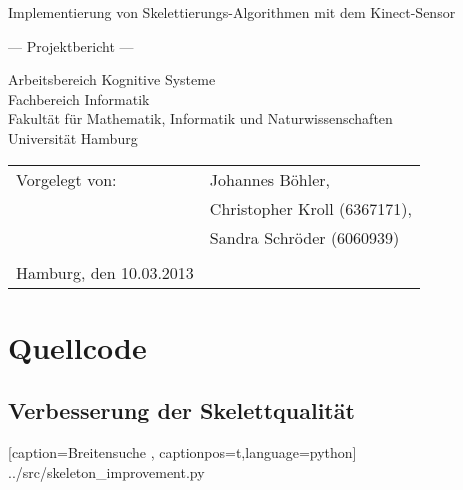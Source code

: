 \documentclass[
	12pt,
	a4paper,
	BCOR10mm,
	DIV14,
	listof=totoc,
	bibliography=totoc,
	headsepline
]{scrreprt}
\begin{document}
\begin{titlepage}
	\begin{center}
		{\titlefont\huge Implementierung von Skelettierungs-Algorithmen mit dem Kinect-Sensor\par}

		\bigskip
		\bigskip

		{\titlefont\Large --- Projektbericht ---\par}

		\bigskip
		\bigskip

		{\large Arbeitsbereich Kognitive Systeme\\
		Fachbereich Informatik\\
		Fakultät für Mathematik, Informatik und Naturwissenschaften\\
		Universität Hamburg\par}
	\end{center}
	
	\vfill
	
	{\large \begin{tabular}{ll}
		Vorgelegt von: & Johannes Böhler, \\
				& Christopher Kroll (6367171), \\ 
				& Sandra Schröder (6060939) \\\\
		Hamburg, den 10.03.2013
	  \end{tabular}\par}

\end{titlepage}

\newcommand{\Autor}[1]{{\hfill \Large \textit{Autor: #1}}}




\tableofcontents



%










\appendix       %
\chapter{Quellcode}
\label{anhang:quellcode}
\section{Verbesserung der Skelettqualität}
 
    [caption={Breitensuche}
       \label{lst:javaclass},
       captionpos=t,language=python]
 {../src/skeleton_improvement.py}
\end{document}
